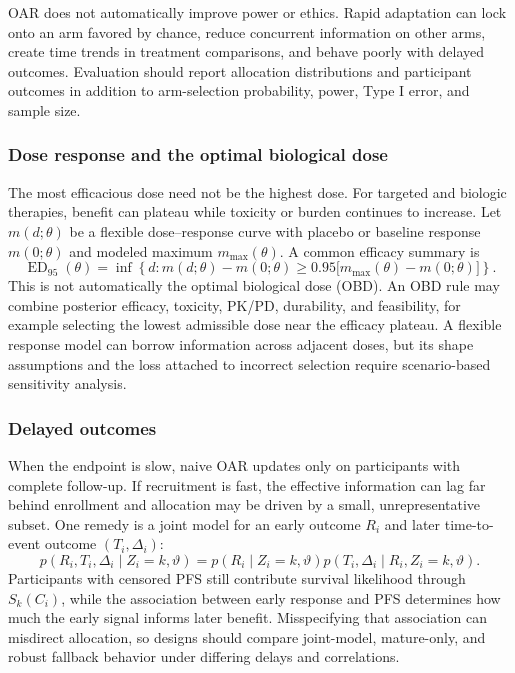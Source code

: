 \documentclass[12pt,oneside]{book}
\numberwithin{equation}{section}
\theoremstyle{definition}
\theoremstyle{plain}
\theoremstyle{remark}
\begin{document}
OAR does not automatically improve power or ethics.  Rapid adaptation can lock
onto an arm favored by chance, reduce concurrent information on other arms,
create time trends in treatment comparisons, and behave poorly with delayed
outcomes.  Evaluation should report allocation distributions and participant
outcomes in addition to arm-selection probability, power, Type I error, and
sample size.

\subsubsection{Dose response and the optimal biological dose}

The most efficacious dose need not be the highest dose.  For targeted and
biologic therapies, benefit can plateau while toxicity or burden continues to
increase.  Let $m(d;\theta)$ be a flexible dose--response curve with placebo or
baseline response $m(0;\theta)$ and modeled maximum $m_{\max}(\theta)$.  A
common efficacy summary is
\[
  \operatorname{ED}_{95}(\theta)
  =\inf\left\{d:
    m(d;\theta)-m(0;\theta)
    \ge 0.95\bigl[m_{\max}(\theta)-m(0;\theta)\bigr]
  \right\}.
\]
This is not automatically the optimal biological dose (OBD).  An OBD rule may
combine posterior efficacy, toxicity, PK/PD, durability, and feasibility, for
example selecting the lowest admissible dose near the efficacy plateau.  A
flexible response model can borrow information across adjacent doses, but its
shape assumptions and the loss attached to incorrect selection require
scenario-based sensitivity analysis.

\subsubsection{Delayed outcomes}

When the endpoint is slow, naive OAR updates only on participants with complete
follow-up.  If recruitment is fast, the effective information can lag far
behind enrollment and allocation may be driven by a small, unrepresentative
subset.  One remedy is a joint model for an early outcome $R_i$ and later
time-to-event outcome $(T_i,\Delta_i)$:
\[
 p(R_i,T_i,\Delta_i\mid Z_i=k,\vartheta)
 =p(R_i\mid Z_i=k,\vartheta)
  p(T_i,\Delta_i\mid R_i,Z_i=k,\vartheta).
\]
Participants with censored PFS still contribute survival likelihood through
$S_k(C_i)$, while the association between early response and PFS determines how
much the early signal informs later benefit.  Misspecifying that association
can misdirect allocation, so designs should compare joint-model, mature-only,
and robust fallback behavior under differing delays and correlations.
\end{document}
